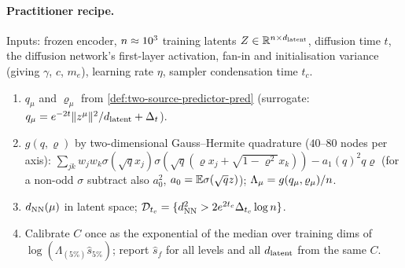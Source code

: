 \paragraph{Practitioner recipe.}
Inputs: frozen encoder, $n\approx10^3$ training latents $Z\in\mathbb{R}^{n\times d_{\mathrm{latent}}}$, diffusion time $t$, the diffusion network's first-layer activation, fan-in and initialisation variance (giving $\gamma$, $c$, $m_e$), learning rate $\eta$, sampler condensation time $t_c$.
\begin{enumerate}
\item $q_\mu$ and $\varrho_\mu$ from \cref{def:two-source-predictor-pred} (surrogate: $q_\mu=e^{-2t}\|z^\mu\|^2/d_{\mathrm{latent}}+\Delta_t$).
\item $g(q,\varrho)$ by two-dimensional Gauss--Hermite quadrature ($40$--$80$ nodes per axis): $\sum_{jk}w_jw_k\sigma(\sqrt q x_j)\sigma(\sqrt q(\varrho x_j+\sqrt{1-\varrho^2}x_k))-a_1(q)^2q\varrho$ (for a non-odd $\sigma$ subtract also $a_0^2$, $a_0=\mathbb{E}\sigma(\sqrt qz)$); $\Lambda_\mu=g(q_\mu,\varrho_\mu)/n$.
\item $d_{\rm NN}(\mu)$ in latent space; $\mathcal D_{t_c}=\{d_{\rm NN}^2>2e^{2t_c}\Delta_{t_c}\log n\}$.
\item Calibrate $C$ once as the exponential of the median over training dims of $\log(\Lambda_{(5\%)}\hat s_{5\%})$; report $\hat s_f$ for all levels and all $d_{\mathrm{latent}}$ from the same $C$.
\end{enumerate}

